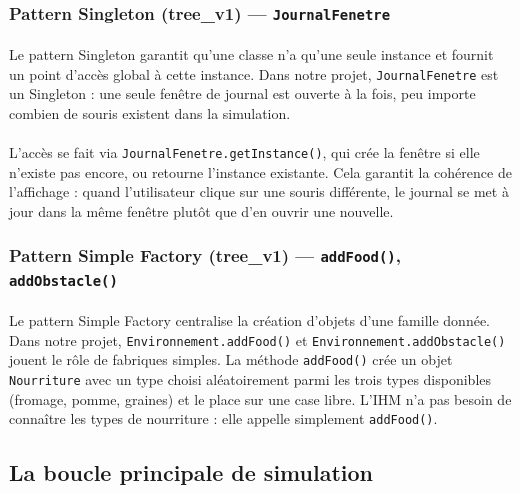 \subsubsection{Pattern Singleton (tree\_v1) --- \texttt{JournalFenetre}}

\paragraph{} Le pattern Singleton garantit qu'une classe n'a qu'une seule instance et fournit un point d'accès global à cette instance. Dans notre projet, \texttt{JournalFenetre} est un Singleton : une seule fenêtre de journal est ouverte à la fois, peu importe combien de souris existent dans la simulation.

\paragraph{} L'accès se fait via \texttt{JournalFenetre.getInstance()}, qui crée la fenêtre si elle n'existe pas encore, ou retourne l'instance existante. Cela garantit la cohérence de l'affichage : quand l'utilisateur clique sur une souris différente, le journal se met à jour dans la même fenêtre plutôt que d'en ouvrir une nouvelle.

\subsubsection{Pattern Simple Factory (tree\_v1) --- \texttt{addFood()}, \texttt{addObstacle()}}

\paragraph{} Le pattern Simple Factory centralise la création d'objets d'une famille donnée. Dans notre projet, \texttt{Environnement.addFood()} et \texttt{Environnement.addObstacle()} jouent le rôle de fabriques simples. La méthode \texttt{addFood()} crée un objet \texttt{Nourriture} avec un type choisi aléatoirement parmi les trois types disponibles (fromage, pomme, graines) et le place sur une case libre. L'IHM n'a pas besoin de connaître les types de nourriture : elle appelle simplement \texttt{addFood()}.

\bigskip

\subsection{La boucle principale de simulation}

